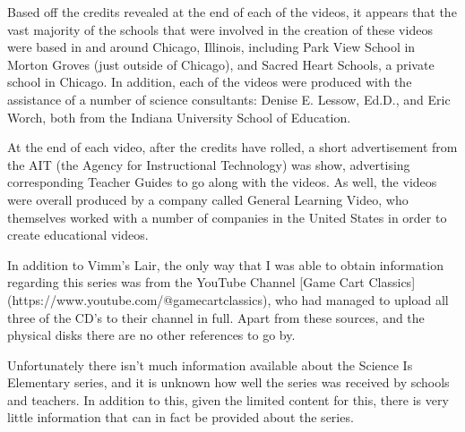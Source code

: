 Based off the credits revealed at the end of each of the videos, it appears that the vast majority of the schools that were involved in the creation of these videos were based in and around Chicago, Illinois, including Park View School in Morton Groves (just outside of Chicago), and Sacred Heart Schools, a private school in Chicago. In addition, each of the videos were produced with the assistance of a number of science consultants: Denise E. Lessow, Ed.D., and Eric Worch, both from the Indiana University School of Education.

At the end of each video, after the credits have rolled, a short advertisement from the AIT (the Agency for Instructional Technology) was show, advertising corresponding Teacher Guides to go along with the videos. As well, the videos were overall produced by a company called General Learning Video, who themselves worked with a number of companies in the United States in order to create educational videos.

In addition to Vimm's Lair, the only way that I was able to obtain information regarding this series was from the YouTube Channel [Game Cart Classics](https://www.youtube.com/@gamecartclassics), who had managed to upload all three of the CD's to their channel in full. Apart from these sources, and the physical disks there are no other references to go by.

Unfortunately there isn't much information available about the Science Is Elementary series, and it is unknown how well the series was received by schools and teachers. In addition to this, given the limited content for this, there is very little information that can in fact be provided about the series.